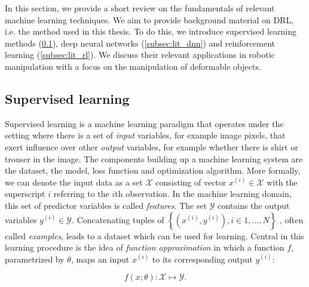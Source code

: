 \documentclass[\home/main.tex]{subfiles}
\begin{document}
In this section, we provide a short review on the fundamentals of relevant machine learning techniques. We aim to provide background material on \acrfull{DRL}, i.e. the method used in this thesis. To do this, we introduce supervised learning methods (\cref{subsec:lit_sl}), deep neural networks (\cref{subsec:lit_dnn}) and reinforcement learning (\cref{subsec:lit_rl}). We discuss their relevant applications in robotic manipulation with a focus on the manipulation of deformable objects. %

\subsection{Supervised learning} \label{subsec:lit_sl}


\newcommand*{\prob}{\mathrm{P}}

Supervised learning is a machine learning paradigm that operates under the setting where there is a set of \textit{input} variables, for example image pixels, that exert influence over other \textit{output} variables, for example whether there is shirt or trouser in the image.
The components building up a machine learning system are the dataset, the model, loss function and optimization algorithm.
More formally, we can denote the input data as a set $\mathcal{X}$ consisting of vector $x^{(i)} \in \mathcal{X} $ with the superscript $i$ referring to the $i$th observation. In the machine learning domain, this set of predictor variables is called \textit{features}. The set $\mathcal{Y}$ contains the output variables $y^{(i)} \in \mathcal{Y}$. Concatenating tuples of
$\left\{\left(x^{(i)}, y^{(i)}\right) , i \in 1,\dots,N \right\}$
, often called \textit{examples}, leads to a dataset which can be used for learning. Central in this learning procedure is the idea of \textit{function approximation} in which a function $f$, parametrized by $\theta$, maps an input $x^{(i)}$ to its corresponding output $y^{(i)}$:

\begin{equation*}
	f(x;\theta): \mathcal{X} \mapsto \mathcal{Y}.
\end{equation*}
\end{document}
